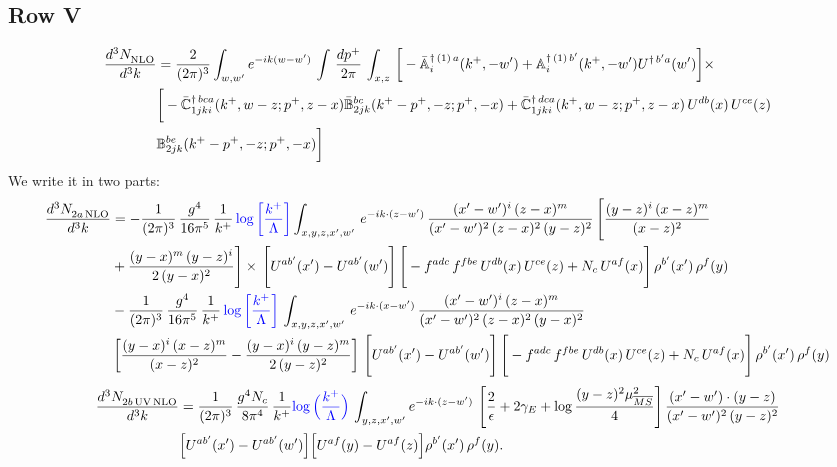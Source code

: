 \documentclass[9pt]{article}
\def\mf#1{\mathbb{#1}}
\numberwithin{equation}{section}
\begin{document}
\subsection{Row V}
\begin{align}
    \frac{d^{3}N_{\rm NLO}^{\rm}}{d^{3}k}  & = \frac{2}{(2\pi)^{3}}  \int_{w, w^\prime} e^{-ik(w-w^\prime)}\, \int\, \frac{dp^{+}}{2\pi}\,\int_{x,z}\, \bigg[-\bar{\mf{A}}^{\dagger\,(1)\,a}_{i}(k^{+},-w^{\prime})+\mf{A}^{\dagger\, (1)\, b^{\prime}}_{i}(k^{+},-w^{\prime})U^{\dagger\,b^{\prime}a}(w^{\prime})\bigg]\times\notag \\ & \bigg[-\Bar{\mf{C}}^{\dagger\, bca}_{1jki}(k^{+},w-z;p^{+},z-x)\Bar{\mf{B}}^{bc}_{2jk}(k^{+}-p^{+},- z;p^{+},-x)+\bar{\mf{C}}^{\dagger\, dca}_{1jki}(k^+,w-z; p^+, z-x)\,U^{db}(x)\,U^{ce}(z) \notag \\ & {\mf{B}}^{be}_{2jk} (k^{+}-p^+, -z; p^+, -x) \bigg]\nonumber
\end{align}
We write it in two parts: 
\begin{align}
    \frac{d^{3}N_{2a\,\rm NLO}^{\rm}}{d^{3}k}  & =   - \frac{1}{(2\pi)^{3}}\, \frac{g^{4}}{16\pi^{5}}\,\frac{1}{k^{+}}\,{\color{blue}\log{\left[\frac{k^{+}}{\Lambda}\right]}} \int_{x,y,z,x',w'}\, e^{-ik\cdot(z-w')}\,\frac{(x'-w')^{i}\,(z-x)^{m}}{(x'-w')^{2}\,(z-x)^{2}\, (y-z)^{2}}\,\Bigg[\frac{(y-z)^{i}\,(x-z)^{m}}{(x-z)^{2}}\notag \\ & +\frac{(y-x)^{m}\,(y-z)^{i}}{2\,(y-x)^{2}}\Bigg]\times\, \Bigg[U^{ab'}(x')-U^{ab'}(w')\Bigg]\,\Bigg[-f^{adc}\,f^{fbe}\,U^{db}(x)\,U^{ce}(z)+N_{c}\,U^{af}(x)\Bigg]\,\rho^{b'}(x')\,\rho^{f}(y)\notag \\ & - \frac{1}{(2\pi)^{3}}\, \frac{g^{4}}{16\pi^{5}}\,\frac{1}{k^{+}}\,{\color{blue}\log{\left[\frac{k^{+}}{\Lambda}\right]}}\, \int_{x,y,z,x',w'}\,e^{-ik\cdot(x-w')}\,\frac{(x'-w')^{i}\,(z-x)^{m}}{(x'-w')^{2}\,(z-x)^{2}\,(y-x)^{2}} \notag \\ &\left[\frac{(y-x)^{i}\,(x-z)^{m}}{(x-z)^{2}}-\frac{(y-x)^{i}\,(y-z)^{m}}{2\,(y-z)^{2}}\right]\, \Bigg[U^{ab'}(x')-U^{ab'}(w')\Bigg]\,\Bigg[-f^{adc}\,f^{fbe}\,U^{db}(x)\,U^{ce}(z)+N_{c}\,U^{af}(x)\Bigg]\,\rho^{b'}(x')\,\rho^{f}(y)
\end{align}
\begin{align}
\frac{d^{3}N_{2b\,\rm UV\, NLO}^{\rm}}{d^{3}k} & = \frac{1}{(2\pi)^{3}}\,\frac{g^{4}N_{c}}{8\pi^{4}}\,\frac{1}{k^{+}}
{\color{blue}\log\Big(\frac{k^{+}}{\Lambda}\Big)}\,\int_{y,z,x',w'}e^{-ik\cdot(z-w')}\, \left[\frac{2}{\epsilon}+2\gamma_{E}+\log\frac{(y-z)^{2}\mu^{2}_{\overline{MS}}}{4}\right]
\frac{(x'-w')\cdot(y-z)}{(x'-w')^{2}\,(y-z)^{2}}\notag \\ &  \Big[U^{ab'}(x')-U^{ab'}(w')\Big]\Big[U^{af}(y)-U^{af}(z)\Big]\rho^{b'}(x')\,\rho^{f}(y).
\end{align}
\end{document}
